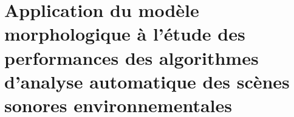 \chapter{Application du modèle morphologique à l’étude des performances des algorithmes d'analyse automatique des scènes sonores environnementales}\label{ch:ml_simuperf}





